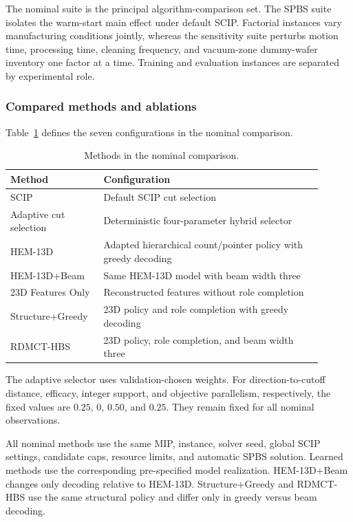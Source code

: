 \documentclass[preprint,12pt,authoryear]{elsarticle}
\newcommand{\method}{RDMCT-HBS}
\begin{document}
The nominal suite is the principal algorithm-comparison set. The SPBS suite
isolates the warm-start main effect under default SCIP. Factorial instances
vary manufacturing conditions jointly, whereas the sensitivity suite
perturbs motion time, processing time, cleaning frequency, and vacuum-zone
dummy-wafer inventory one factor at a time. Training and evaluation instances
are separated by experimental role.

\subsubsection{Compared methods and ablations}

Table~\ref{tab:methods} defines the seven configurations in the nominal
comparison.

\begin{table}[htbp]
\centering
\caption{Methods in the nominal comparison.}
\label{tab:methods}
\begin{tabular}{p{0.25\linewidth}p{0.65\linewidth}}
\toprule
Method & Configuration \\
\midrule
SCIP & Default SCIP cut selection \\
Adaptive cut selection & Deterministic four-parameter hybrid selector \\
HEM-13D & Adapted hierarchical count/pointer policy with greedy decoding \\
HEM-13D+Beam & Same HEM-13D model with beam width three \\
23D Features Only & Reconstructed features without role completion \\
Structure+Greedy & 23D policy and role completion with greedy decoding \\
\method{} & 23D policy, role completion, and beam width three \\
\bottomrule
\end{tabular}
\end{table}

The adaptive selector uses validation-chosen weights. For
direction-to-cutoff distance, efficacy, integer support, and objective
parallelism, respectively, the fixed values are $0.25$, $0$, $0.50$, and
$0.25$. They remain fixed for all nominal observations.

All nominal methods use the same MIP, instance, solver seed, global SCIP
settings, candidate caps, resource limits, and automatic SPBS solution.
Learned methods use the corresponding pre-specified model realization.
HEM-13D+Beam changes only decoding relative to HEM-13D.
Structure+Greedy and \method{} use the same structural policy and differ only
in greedy versus beam decoding.
\end{document}
